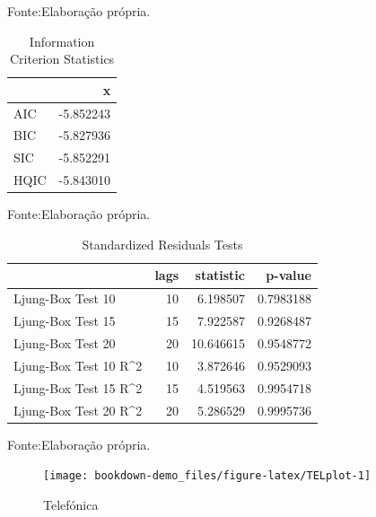 \documentclass[
  12pt,
  a4paper,
  openany]{book}
\begin{document}
Fonte:Elaboração própria.

\justifying
\bigskip

\begin{table}[!h]

\caption{\label{tab:unnamed-chunk-22}Information Criterion Statistics}
\centering
\begin{tabular}[t]{lr}
\toprule
  & x\\
\midrule
AIC & -5.852243\\
BIC & -5.827936\\
SIC & -5.852291\\
HQIC & -5.843010\\
\bottomrule
\end{tabular}
\end{table}
\FloatBarrier
\centering

Fonte:Elaboração própria.

\justifying
\bigskip

\begin{table}[!h]

\caption{\label{tab:unnamed-chunk-23}Standardized Residuals Tests}
\centering
\begin{tabular}[t]{lrrr}
\toprule
  & lags & statistic & p-value\\
\midrule
Ljung-Box Test 10 & 10 & 6.198507 & 0.7983188\\
Ljung-Box Test 15 & 15 & 7.922587 & 0.9268487\\
Ljung-Box Test 20 & 20 & 10.646615 & 0.9548772\\
Ljung-Box Test 10 R\textasciicircum{}2 & 10 & 3.872646 & 0.9529093\\
Ljung-Box Test 15 R\textasciicircum{}2 & 15 & 4.519563 & 0.9954718\\
\addlinespace
Ljung-Box Test 20 R\textasciicircum{}2 & 20 & 5.286529 & 0.9995736\\
\bottomrule
\end{tabular}
\end{table}
\FloatBarrier
\centering

Fonte:Elaboração própria.

\justifying
\bigskip
\begin{figure}

{\centering \texttt{[image: bookdown-demo\_files/figure-latex/TELplot-1]} 

}

\caption{Telefónica}\label{fig:TELplot}
\end{figure}
\FloatBarrier
\centering
\end{document}
